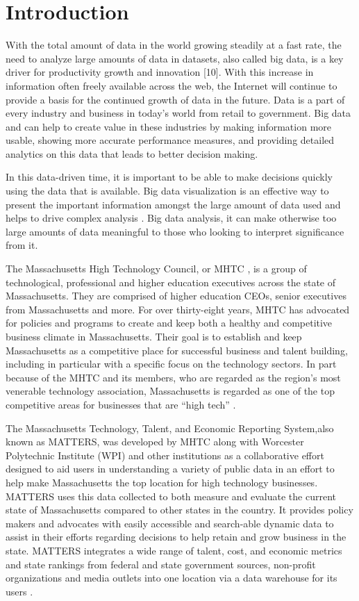 \chapter{Introduction}

	With the total amount of data in the world growing steadily at a fast rate, 
	the need to analyze large amounts of data in datasets, also called big data, is a 
	key driver for productivity growth and innovation [10]. With this increase in 
	information often freely available across the web, 
	the Internet will continue to provide a basis for the continued growth of 
	data in the future. Data is a part of every industry and business in today's 
	world from retail to government. Big data and can help to create
	 value in these industries by making information more usable, showing more 
	 accurate performance measures, and providing detailed analytics on this data that 
	 leads to better decision making.

	In this data-driven time, it is important to be able to make decisions 
	quickly using the data that is available. Big data visualization is an 
	effective way to present the important information amongst the large amount 
	of data used and helps to drive complex analysis \cite{bigdata}. Big 
	data analysis, it can make otherwise too large amounts of data meaningful 
	to those who looking to interpret significance from it.

	The Massachusetts High Technology Council, or MHTC \cite{mhtc}, is a group of technological, 
	professional and higher education executives across the state of Massachusetts. 
	They are comprised of higher education CEOs, senior executives from Massachusetts 
	and more. For over thirty-eight years, MHTC has advocated for policies 
	and programs to create and keep both a healthy and competitive business climate in Massachusetts. 
	Their goal is to establish and keep Massachusetts as a competitive place for 
	successful business and talent building, including in particular with a specific focus on the 
	technology sectors. In part because of the MHTC and its members, who are 
	regarded as the region's most venerable technology association, Massachusetts 
	is regarded as one of the top competitive areas for businesses that are “high tech” \cite{mhtc}.

	The Massachusetts Technology, Talent, and Economic Reporting System,also known as MATTERS, 
	was developed by MHTC along with Worcester Polytechnic Institute (WPI) and other 
	institutions as a collaborative effort designed to aid users in understanding a 
	variety of public data in an effort to help make Massachusetts the top location 
	for high technology businesses. MATTERS uses this data collected to both measure 
	and evaluate the current state of Massachusetts compared to other states in the 
	country. It provides policy makers and advocates with easily accessible and search-able 
	dynamic data to assist in their efforts regarding decisions to help  retain and 
	grow business in the state. MATTERS integrates a wide 
	range of talent, cost, and economic metrics and state rankings from federal and 
	state government sources, non-profit organizations and media outlets into one 
	location via a data warehouse for its users \cite{about}. 

